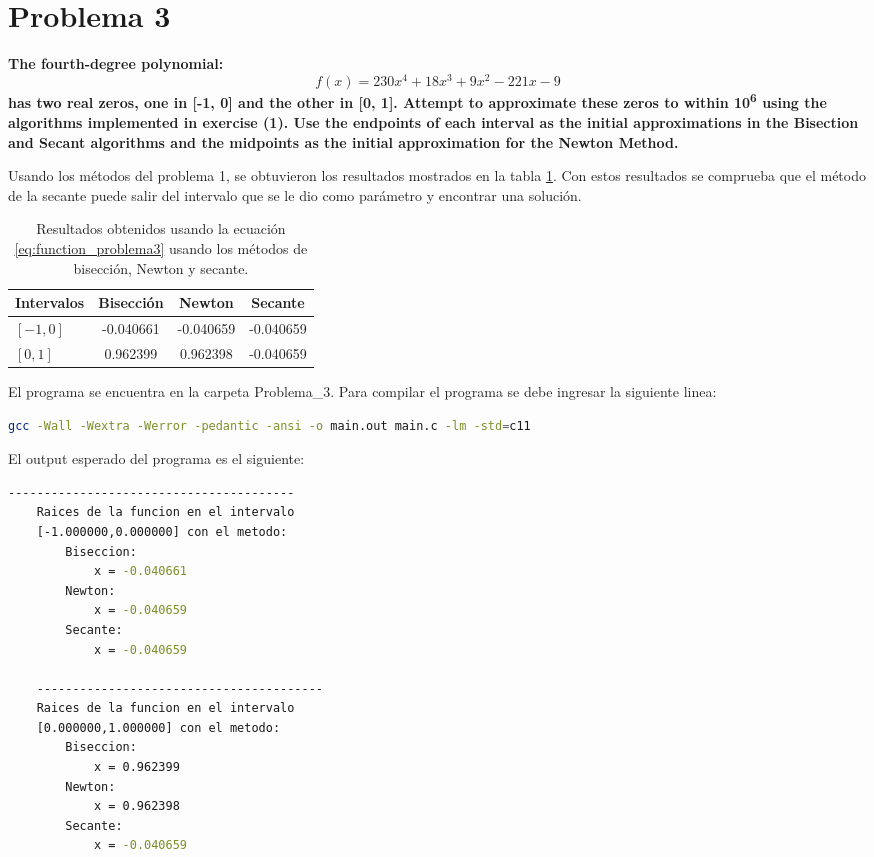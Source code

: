 \section*{Problema 3}
\textbf{The fourth-degree polynomial:}
\begin{equation}
	f(x)= 230x^4+18x^3+9x^2-221x-9
	\label{eq:function_problema3}
\end{equation}
\textbf{has two real zeros, one in [-1, 0] and the other in [0, 1]. Attempt to approximate these zeros to within 10\textsuperscript{6} using the algorithms implemented in exercise (1). Use the endpoints of each interval as the initial approximations in the Bisection and Secant algorithms and the midpoints as the initial approximation for the Newton Method.}

Usando los métodos del problema 1, se obtuvieron los resultados mostrados en la tabla \ref{table:results_problema3}. Con estos resultados se comprueba que el método de la secante puede salir del intervalo que se le dio como parámetro y encontrar una solución.
\begin{table}[H]
	\centering
	\begin{tabular}{lccc}
		\hline
		\textbf{Intervalos} & \textbf{Bisección} & \textbf{Newton} & \textbf{Secante} \\ \hline
		$[-1,0]$            & -0.040661          & -0.040659       & -0.040659        \\
		$[0,1]$             & 0.962399           & 0.962398        & -0.040659        \\ \hline
	\end{tabular}
	\caption{Resultados obtenidos usando la ecuación \ref{eq:function_problema3} usando los métodos de bisección, Newton y secante.}
	\label{table:results_problema3}
\end{table}

El programa se encuentra en la carpeta \textcolor{citecolor}{Problema\_3}. Para compilar el programa se debe ingresar la siguiente linea:

\begin{lstlisting}[language=bash]
    gcc -Wall -Wextra -Werror -pedantic -ansi -o main.out main.c -lm -std=c11
\end{lstlisting}

El output esperado del programa es el siguiente:
\begin{lstlisting}[language=bash]
    ----------------------------------------
    Raices de la funcion en el intervalo
    [-1.000000,0.000000] con el metodo:
        Biseccion:
            x = -0.040661
        Newton:
            x = -0.040659
        Secante:
            x = -0.040659

    ----------------------------------------
    Raices de la funcion en el intervalo
    [0.000000,1.000000] con el metodo:
        Biseccion:
            x = 0.962399
        Newton:
            x = 0.962398
        Secante:
            x = -0.040659
\end{lstlisting}
